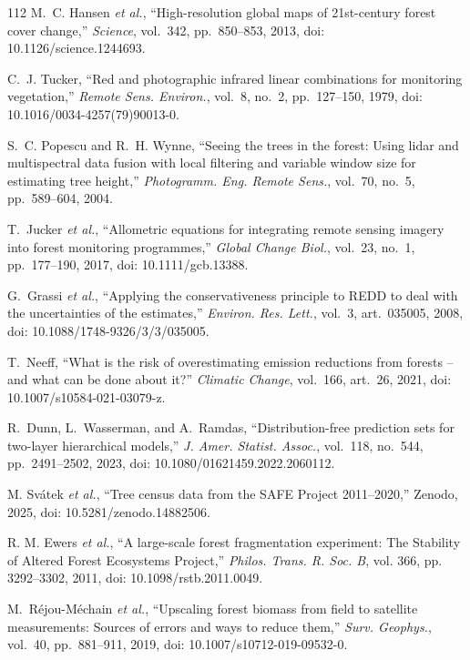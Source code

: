 \documentclass[conference,a4paper]{IEEEtran}
\begin{document}
\begin{thebibliography}{112}
M.~C. Hansen \textit{et al.}, ``High-resolution global maps of 21st-century forest cover change,'' \textit{Science}, vol.~342, pp.~850--853, 2013, doi: 10.1126/science.1244693.

C.~J. Tucker, ``Red and photographic infrared linear combinations for monitoring vegetation,'' \textit{Remote Sens. Environ.}, vol.~8, no.~2, pp.~127--150, 1979, doi: 10.1016/0034-4257(79)90013-0.

S.~C. Popescu and R.~H. Wynne, ``Seeing the trees in the forest: Using lidar and multispectral data fusion with local filtering and variable window size for estimating tree height,'' \textit{Photogramm. Eng. Remote Sens.}, vol.~70, no.~5, pp.~589--604, 2004.

T.~Jucker \textit{et al.}, ``Allometric equations for integrating remote sensing imagery into forest monitoring programmes,'' \textit{Global Change Biol.}, vol.~23, no.~1, pp.~177--190, 2017, doi: 10.1111/gcb.13388.

G.~Grassi \textit{et al.}, ``Applying the conservativeness principle to REDD to deal with the uncertainties of the estimates,'' \textit{Environ. Res. Lett.}, vol.~3, art.~035005, 2008, doi: 10.1088/1748-9326/3/3/035005.

T.~Neeff, ``What is the risk of overestimating emission reductions from forests -- and what can be done about it?'' \textit{Climatic Change}, vol.~166, art.~26, 2021, doi: 10.1007/s10584-021-03079-z.

R.~Dunn, L.~Wasserman, and A.~Ramdas, ``Distribution-free prediction sets for two-layer hierarchical models,'' \textit{J. Amer. Statist. Assoc.}, vol.~118, no.~544, pp.~2491--2502, 2023, doi: 10.1080/01621459.2022.2060112.

M. Sv\'atek \textit{et al.}, ``Tree census data from the SAFE Project 2011--2020,'' Zenodo, 2025, doi: 10.5281/zenodo.14882506.

R. M. Ewers \textit{et al.}, ``A large-scale forest fragmentation experiment: The Stability of Altered Forest Ecosystems Project,'' \textit{Philos. Trans. R. Soc. B}, vol. 366, pp. 3292--3302, 2011, doi: 10.1098/rstb.2011.0049.

M.~R\'ejou-M\'echain \textit{et al.}, ``Upscaling forest biomass from field to satellite measurements: Sources of errors and ways to reduce them,'' \textit{Surv. Geophys.}, vol.~40, pp.~881--911, 2019, doi: 10.1007/s10712-019-09532-0.


\end{thebibliography}
\end{document}
